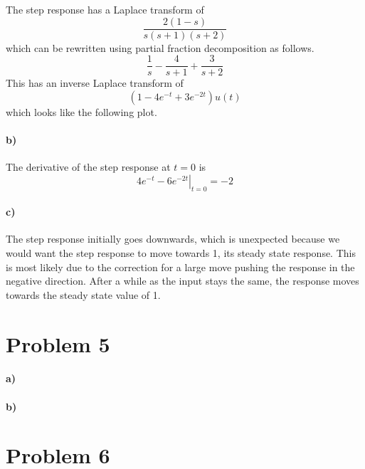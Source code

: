 \documentclass[12pt]{article}
\begin{document}
The step response has a Laplace transform of
\[\frac{2(1-s)}{s(s+1)(s+2)}\]
which can be rewritten using partial fraction decomposition as follows.
\[\frac{1}{s}-\frac{4}{s+1} + \frac{3}{s+2}\]
This has an inverse Laplace transform of
\[(1-4e^{-t}+3e^{-2t})u(t)\]
which looks like the following plot.
\begin{center}
\end{center}

\paragraph{b)}

The derivative of the step response at \(t=0\) is
\[\left.4e^{-t}-6e^{-2t}\right|_{t=0}=-2\]

\paragraph{c)}

The step response initially goes downwards, which is unexpected because we would want
the step response to move towards 1, its steady state response. This is most likely
due to the correction for a large move pushing the response in the negative direction.
After a while as the input stays the same, the response moves towards the steady state
value of 1.

\section*{Problem 5}

\paragraph{a)}

\paragraph{b)}

\section*{Problem 6}
\end{document}

